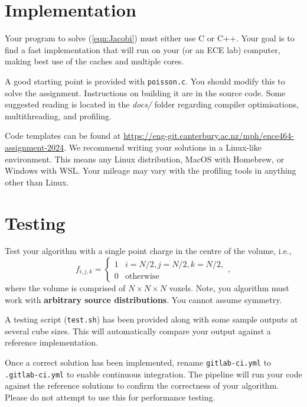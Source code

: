 \documentclass[a4paper,11pt]{article}
\newcommand{\code}[1]{\texttt{#1}}
\begin{document}
\section{Implementation}

Your program to solve (\ref{eqn:Jacobi}) must either use C or C++.
Your goal is to find a fast implementation that will run on your (or
an ECE lab) computer, making best use of the caches and multiple
cores.

A good starting point is provided with \code{poisson.c}. You should
modify this to solve the assignment.  Instructions on building it are
in the source code.  Some suggested reading is located in the
\emph{docs/} folder regarding compiler optimisations, multithreading,
and profiling.

Code templates can be found at
\url{https://eng-git.canterbury.ac.nz/mph/ence464-assignment-2024}. We
recommend writing your solutions in a Linux-like environment. This
means any Linux distribution, MacOS with Homebrew, or Windows with
WSL. Your mileage may vary with the profiling tools in anything other
than Linux.


\section{Testing}

Test your algorithm with a single point charge in the centre of the
volume, i.e.,
%
\begin{equation}
  f_{i,j,k} = \left\{
  \begin{array}{ll}
    1 & i=N/2, j=N/2, k=N/2, \\
    0 & \mbox{otherwise}
  \end{array}\right.,
\end{equation}
%
where the volume is comprised of $N \times N \times N$ voxels.  Note,
you algorithm must work with \textbf{arbitrary source distributions}.
You cannot assume symmetry.

A testing script (\code{test.sh}) has been provided along with some sample
outputs at several cube sizes. This will automatically compare your output
against a reference implementation.

Once a correct solution has been implemented, rename
\code{gitlab-ci.yml} to \code{.gitlab-ci.yml} to enable continuous
integration. The pipeline will run your code against the reference
solutions to confirm the correctness of your algorithm. Please do not
attempt to use this for performance testing.

\end{document}
